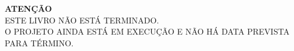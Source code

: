 \thispagestyle{empty}

\begin{center}
{\Huge \textbf{ATENÇÃO}\\
ESTE LIVRO NÃO ESTÁ TERMINADO.\\
O PROJETO AINDA ESTÁ EM EXECUÇÃO E NÃO HÁ DATA PREVISTA PARA TÉRMINO.}
\end{center}
